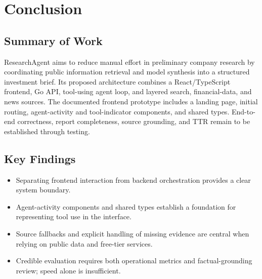 \documentclass[12pt,a4paper,oneside]{report}
\begin{document}
\chapter{Conclusion}
\section{Summary of Work}
ResearchAgent aims to reduce manual effort in preliminary company research by coordinating public information retrieval and model synthesis into a structured investment brief. Its proposed architecture combines a React/TypeScript frontend, Go API, tool-using agent loop, and layered search, financial-data, and news sources. The documented frontend prototype includes a landing page, initial routing, agent-activity and tool-indicator components, and shared types. End-to-end correctness, report completeness, source grounding, and TTR remain to be established through testing.

\section{Key Findings}
\begin{itemize}[leftmargin=*]
\item Separating frontend interaction from backend orchestration provides a clear system boundary.
\item Agent-activity components and shared types establish a foundation for representing tool use in the interface.
\item Source fallbacks and explicit handling of missing evidence are central when relying on public data and free-tier services.
\item Credible evaluation requires both operational metrics and factual-grounding review; speed alone is insufficient.
\end{itemize}
\end{document}
